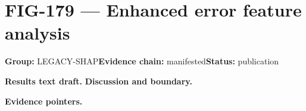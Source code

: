 \clearpage
\section{FIG-179 --- Enhanced error feature analysis}
\label{figpage:fig-179}
\textbf{Group:} LEGACY-SHAP\quad \textbf{Evidence chain:} manifested\quad \textbf{Status:} publication

\textbf{Results text draft.} 
\textbf{Discussion and boundary.} 


\textbf{Evidence pointers.}



\vfill
